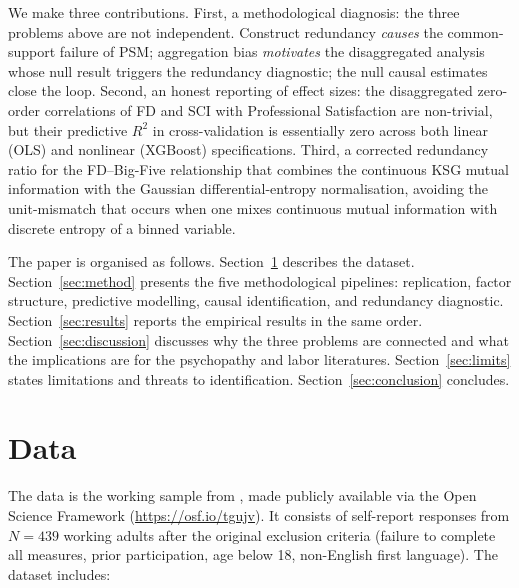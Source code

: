 \documentclass[11pt,a4paper]{article}
\begin{document}
We make three contributions. First, a methodological diagnosis: the
three problems above are not independent. Construct redundancy
\emph{causes} the common-support failure of PSM; aggregation bias
\emph{motivates} the disaggregated analysis whose null result
triggers the redundancy diagnostic; the null causal estimates close
the loop. Second, an honest reporting of effect sizes: the
disaggregated zero-order correlations of FD and SCI with
Professional Satisfaction are non-trivial, but their predictive
$R^2$ in cross-validation is essentially zero across both linear
(OLS) and nonlinear (XGBoost) specifications. Third, a corrected
redundancy ratio for the FD--Big-Five relationship that combines
the continuous KSG mutual information with the Gaussian
differential-entropy normalisation, avoiding the unit-mismatch
that occurs when one mixes continuous mutual information with
discrete entropy of a binned variable.

The paper is organised as follows. Section~\ref{sec:data} describes
the dataset. Section~\ref{sec:method} presents the five methodological
pipelines: replication, factor structure, predictive modelling, causal
identification, and redundancy diagnostic. Section~\ref{sec:results}
reports the empirical results in the same order.
Section~\ref{sec:discussion} discusses why the three problems are
connected and what the implications are for the psychopathy and labor
literatures. Section~\ref{sec:limits} states limitations and threats
to identification. Section~\ref{sec:conclusion} concludes.

\section{Data}
\label{sec:data}

The data is the working sample from \citet{eisenbarth2018}, made
publicly available via the Open Science Framework
(\url{https://osf.io/tgujv}). It consists of self-report responses
from $N=439$ working adults after the original exclusion criteria
(failure to complete all measures, prior participation, age below 18,
non-English first language). The dataset includes:
\end{document}
